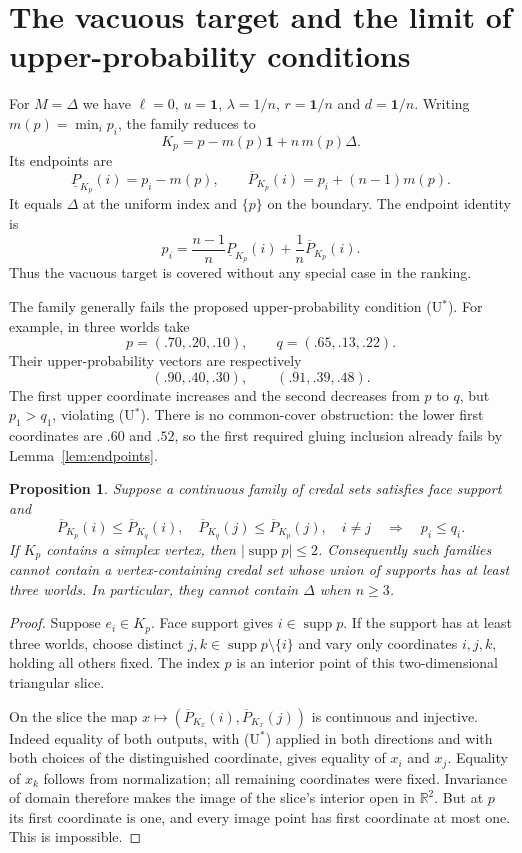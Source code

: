 \documentclass[11pt]{article}
\newtheorem{proposition}[theorem]{Proposition}
\theoremstyle{remark}
\newcommand{\R}{\mathbb R}
\newcommand{\one}{\mathbf 1}
\newcommand{\supp}{\operatorname{supp}}
\newcommand{\lo}{\underline P}
\newcommand{\hi}{\overline P}
\begin{document}
\section{The vacuous target and the limit of upper-probability conditions}

For $M=\Delta$ we have $\ell=0$, $u=\one$, $\lambda=1/n$, $r=\one/n$ and
$d=\one/n$. Writing $m(p)=\min_i p_i$, the family reduces to
\[
 \boxed{\quad K_p=p-m(p)\one+n\,m(p)\Delta.\quad}
 \tag{9}\label{eq:vacuous}
\]
Its endpoints are
\[
 \lo_{K_p}(i)=p_i-m(p),\qquad
 \hi_{K_p}(i)=p_i+(n-1)m(p).
\]
It equals $\Delta$ at the uniform index and $\{p\}$ on the boundary. The
endpoint identity is
\[
 p_i=\frac{n-1}{n}\lo_{K_p}(i)+\frac1n\hi_{K_p}(i).
\]
Thus the vacuous target is covered without any special case in the ranking.

The family generally fails the proposed upper-probability condition (U$^*$).
For example, in three worlds take
\[
 p=(.70,.20,.10),\qquad q=(.65,.13,.22).
\]
Their upper-probability vectors are respectively
\[
 (.90,.40,.30),\qquad (.91,.39,.48).
\]
The first upper coordinate increases and the second decreases from $p$ to $q$,
but $p_1>q_1$, violating (U$^*$). There is no common-cover obstruction:
the lower first coordinates are $.60$ and $.52$, so the first required gluing
inclusion already fails by Lemma~\ref{lem:endpoints}.

\begin{proposition}\label{prop:ustar}
Suppose a continuous family of credal sets satisfies face support and
\[
 \hi_{K_p}(i)\le\hi_{K_q}(i),\quad
 \hi_{K_q}(j)\le\hi_{K_p}(j),\quad i\ne j
 \quad\Longrightarrow\quad p_i\le q_i.
 \tag{U$^*$}\label{eq:ustar}
\]
If $K_p$ contains a simplex vertex, then $|\supp p|\le2$. Consequently such
families cannot contain a vertex-containing credal set whose union of supports
has at least three worlds. In particular, they cannot contain $\Delta$ when
$n\ge3$.
\end{proposition}
\begin{proof}
Suppose $e_i\in K_p$. Face support gives $i\in\supp p$. If the support has
at least three worlds, choose distinct $j,k\in\supp p\setminus\{i\}$ and
vary only coordinates $i,j,k$, holding all others fixed. The index $p$ is an
interior point of this two-dimensional triangular slice.

On the slice the map
$x\mapsto(\hi_{K_x}(i),\hi_{K_x}(j))$ is continuous and injective.
Indeed equality of both outputs, with (U$^*$) applied in both directions and
with both choices of the distinguished coordinate, gives equality of $x_i$
and $x_j$. Equality of $x_k$ follows from normalization; all remaining
coordinates were fixed. Invariance of domain therefore makes the image of the
slice's interior open in $\R^2$. But at $p$ its first coordinate is one,
and every image point has first coordinate at most one. This is impossible.
\end{proof}
\end{document}

